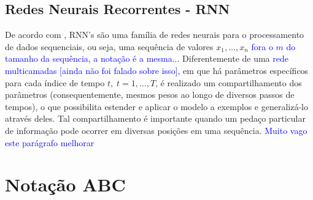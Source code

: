 \documentclass{automatextcc}
\newcommand{\pumi}[1]{\textcolor{blue}{#1}}
\begin{document}
\subsection{Redes Neurais Recorrentes - RNN}
De acordo com \citet{mit2016deeplearningbook}, RNN's são uma família de redes neurais para o processamento de dados sequenciais, ou seja, uma sequência de valores $x_1,\dots,x_n$ \pumi{fora o $m$ do tamanho da sequência, a notação é a mesma..}. Diferentemente de uma \pumi{rede multicamadas [ainda não foi falado sobre isso]}, em que há parâmetros específicos para cada índice de tempo $t, \; t=1,\dots,T$, é realizado um compartilhamento dos parâmetros (consequentemente, mesmos pesos ao longo de diversos passos de tempos), o que possibilita estender e aplicar o modelo a exemplos e generalizá-lo através deles. Tal compartilhamento é importante quando um pedaço particular de informação pode ocorrer em diversas posições em uma sequência. \pumi{Muito vago este parágrafo melhorar}






\section{Notação ABC}
\end{document}
